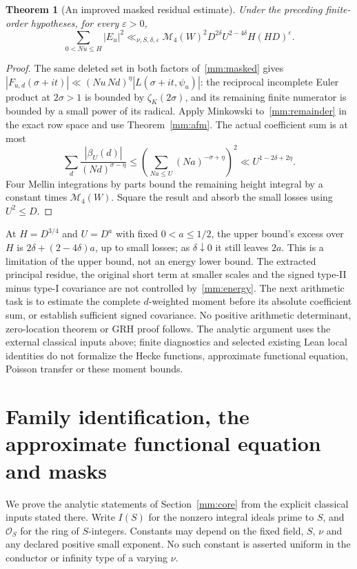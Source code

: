 \documentclass[11pt,oneside,openany]{book}
\newtheorem{theorem}{Theorem}[chapter]
\theoremstyle{definition}\newtheorem{definition}[theorem]{Definition}
\theoremstyle{remark}\newtheorem{remark}[theorem]{Remark}
\begin{document}
\begin{theorem}[An improved masked residual estimate]
\label{mm:residual}
Under the preceding finite-order hypotheses, for every $\varepsilon>0$,
\begin{equation}\label{mm:energy}
 \sum_{0<Nu\le H}|E_u|^2
 \ll_{\nu,S,\delta,\varepsilon}
 \mathcal M_4(W)^2D^{2\delta}U^{2-4\delta}H(HD)^\varepsilon.
\end{equation}
\end{theorem}
\begin{proof}
The same deleted set in both factors of~\eqref{mm:masked} gives
$|F_{u,d}(\sigma+it)|\ll (Nu\,Nd)^\eta|L(\sigma+it,\psi_u)|$:
the reciprocal incomplete Euler product at $2\sigma>1$ is bounded
by $\zeta_K(2\sigma)$, and its remaining finite numerator is bounded
by a small power of its radical. Apply Minkowski to~\eqref{mm:remainder}
in the exact row space and use Theorem~\ref{mm:afm}. The actual coefficient
sum is at most
\[
 \sum_d\frac{|\beta_U(d)|}{(Nd)^{\sigma-\eta}}
 \le\left(\sum_{Na\le U}(Na)^{-\sigma+\eta}\right)^2
 \ll U^{1-2\delta+2\eta}.
\]
Four Mellin integrations by parts bound the remaining height integral
by a constant times $\mathcal M_4(W)$. Square the result and absorb
the small losses using $U^2\le D$.
\end{proof}

At $H=D^{3/4}$ and $U=D^a$ with fixed $0<a\le1/2$, the upper bound's excess
over $H$ is $2\delta+(2-4\delta)a$, up to small losses; as
$\delta\downarrow0$ it still leaves $2a$. This is a limitation of the
upper bound, not an energy lower bound. The extracted principal residue,
the original short term at smaller scales and the signed type-II minus
type-I covariance are not controlled by~\eqref{mm:energy}. The next
arithmetic task is to estimate the complete $d$-weighted moment before
its absolute coefficient sum, or establish sufficient signed covariance.
No positive arithmetic determinant, zero-location theorem or GRH proof
follows. The analytic argument uses the external classical inputs above;
finite diagnostics and selected existing Lean local identities do not
formalize the Hecke functions, approximate functional equation, Poisson
transfer or these moment bounds.

\section{Family identification, the approximate functional equation and masks}
\label{mm:details}
We prove the analytic statements of Section~\ref{mm:core} from the
explicit classical inputs stated there. Write $I(S)$ for the nonzero
integral ideals prime to $S$, and $\mathcal O_S$ for the ring of
$S$-integers. Constants may depend on the fixed field, $S$, $\nu$ and
any declared positive small exponent. No such constant is asserted
uniform in the conductor or infinity type of a varying $\nu$.
\end{document}
